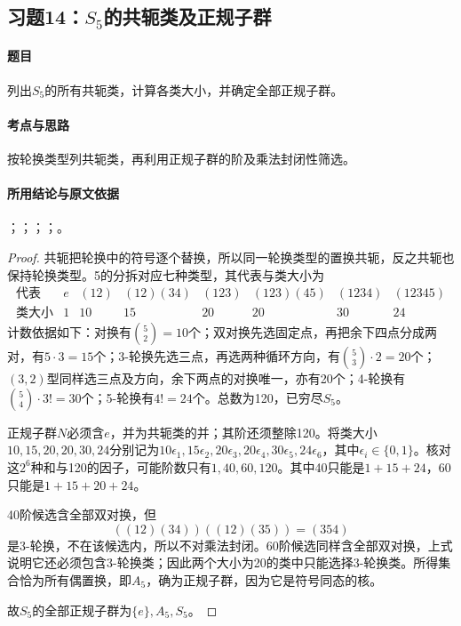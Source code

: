 \subsection{习题14：\texorpdfstring{$S_5$的共轭类及正规子群}{S5的共轭类及正规子群}}
\label{ex:2:14}

\paragraph{题目}
列出$S_5$的所有共轭类，计算各类大小，并确定全部正规子群。

\paragraph{考点与思路}
按轮换类型列共轭类，再利用正规子群的阶及乘法封闭性筛选。

\paragraph{所用结论与原文依据}
；；；；。


\begin{proof}
共轭把轮换中的符号逐个替换，所以同一轮换类型的置换共轭，反之共轭也保持轮换类型。5的分拆对应七种类型，其代表与类大小为
\[
\begin{array}{c|rrrrrrr}
\text{代表}&e&(12)&(12)(34)&(123)&(123)(45)&(1234)&(12345)\\\hline
\text{类大小}&1&10&15&20&20&30&24
\end{array}
\]
计数依据如下：对换有$\binom52=10$个；双对换先选固定点，再把余下四点分成两对，有$5\cdot3=15$个；3-轮换先选三点，再选两种循环方向，有$\binom53\cdot2=20$个；$(3,2)$型同样选三点及方向，余下两点的对换唯一，亦有20个；4-轮换有$\binom54\cdot3!=30$个；5-轮换有$4!=24$个。总数为120，已穷尽$S_5$。

正规子群$N$必须含$e$，并为共轭类的并；其阶还须整除120。将类大小$10,15,20,20,30,24$分别记为$10\epsilon_1,15\epsilon_2,20\epsilon_3,20\epsilon_4,30\epsilon_5,24\epsilon_6$，其中$\epsilon_i\in\{0,1\}$。核对这$2^6$种和与120的因子，可能阶数只有$1,40,60,120$。其中40只能是$1+15+24$，60只能是$1+15+20+24$。

40阶候选含全部双对换，但
\[
((12)(34))((12)(35))=(354)
\]
是3-轮换，不在该候选内，所以不对乘法封闭。60阶候选同样含全部双对换，上式说明它还必须包含3-轮换类；因此两个大小为20的类中只能选择3-轮换类。所得集合恰为所有偶置换，即$A_5$，确为正规子群，因为它是符号同态的核。

故$S_5$的全部正规子群为$\{e\},A_5,S_5$。
\end{proof}

